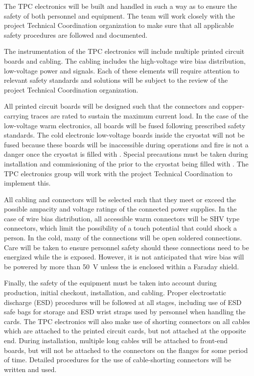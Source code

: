 The TPC electronics will be built and handled in such a way as to ensure the safety of both personnel and equipment.  The team will work closely with the project Technical Coordination organization to make sure that all applicable safety procedures are followed and documented.

The instrumentation of the TPC electronics will include multiple printed circuit boards and cabling.  The cabling includes the high-voltage wire bias distribution, low-voltage power and signals.  Each of these elements will require attention to relevant safety standards and solutions will be subject to the review of the project Technical Coordination organization.

All printed circuit boards will be designed such that the connectors and copper-carrying traces are rated to sustain the maximum current load.  In the case of the low-voltage warm electronics, all boards will be fused following prescribed safety standards.  The cold electronic low-voltage boards inside the cryostat will not be fused because these boards will be inaccessible during operations and fire is not a danger once the cryostat is filled with \lar.  Special precautions must be taken during installation and commissioning of the  prior to the cryostat being filled with \lar.  The TPC electronics group will work with the project Technical Coordination to implement this.

All cabling and connectors will be selected such that they meet or exceed the possible ampacity and voltage ratings of the connected power supplies.  In the case of  wire bias distribution, all accessible warm connectors will be SHV type connectors, which limit the possibility of a touch potential that could shock a person.  In the cold, many of the  connections will be open soldered connections. Care will be taken to ensure personnel safety should these connections need to be energized while the  is exposed.  However, it is not anticipated that  wire bias will be powered by more than \SI{50}{V} unless the  is enclosed within a Faraday shield.

Finally, the safety of the equipment must be taken into account during production, initial checkout, installation, and cabling.  Proper electrostatic discharge (ESD) procedures will be followed at all stages, including use of ESD safe bags for storage and ESD wrist straps used by personnel when handling the cards.  The TPC electronics will also make use of shorting connectors on all cables which are attached to the printed circuit cards, but not attached at the opposite end.  During installation, multiple long cables will be attached to front-end boards, but will not be attached to the connectors on the flanges for some period of time.  Detailed procedures for the use of cable-shorting connectors will be written and used.

